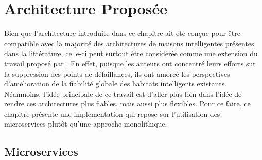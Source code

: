 \section{Architecture Proposée}

Bien que l'architecture introduite dans ce chapitre ait été conçue pour être compatible avec la majorité des architectures de maisons intelligentes présentes dans la littérature, celle-ci peut surtout être considérée comme une extension du travail proposé par \cite{Plantevin2018}. En effet, puisque les auteurs ont concentré leurs efforts sur la suppression des points de défaillances, ils ont amorcé les perspectives d'amélioration de la fiabilité globale des habitats intelligents existants. Néanmoins, l'idée principale de ce travail est d'aller plus loin dans l'idée de rendre ces architectures plus fiables, mais aussi plus flexibles. Pour ce faire, ce chapitre présente une implémentation qui repose sur l'utilisation des microservices plutôt qu'une approche monolithique.

\subsection{Microservices}

